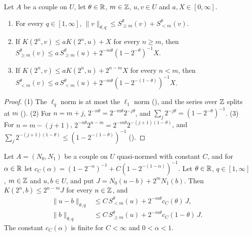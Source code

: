 \begin{lemma}
\label{lem:holmstedt-sums}
\leanok
{}
Let $A$ be a couple on $U$, let $\theta \in \mathbb{R}$, $m \in \mathbb{Z}$, $u, v \in U$ and
$a, X \in [0, \infty]$.
\begin{enumerate}
  \item For every $q \in [1, \infty]$,
    $\|v\|_{\theta, q} \leq S^{\theta}_{\geq m}(v) + S^{\theta}_{<m}(v)$.
  \item If $K(2^n, v) \leq a K(2^n, u) + X$ for every $n \geq m$, then
    $S^{\theta}_{\geq m}(v) \leq a \, S^{\theta}_{\geq m}(u) + 2^{-m\theta} (1 - 2^{-\theta})^{-1}
    X$.
  \item If $K(2^n, v) \leq a K(2^n, u) + 2^{n-m} X$ for every $n < m$, then
    $S^{\theta}_{<m}(v) \leq a \, S^{\theta}_{<m}(u) + 2^{-m\theta}
    (1 - 2^{-(1-\theta)})^{-1} X$.
\end{enumerate}
\end{lemma}

\begin{proof}
\leanok
(1) The $\ell_q$ norm is at most the $\ell_1$ norm (), and the series over
$\mathbb{Z}$ splits at $m$ (). (2) For $n = m + j$,
$2^{-n\theta} = 2^{-m\theta} 2^{-j\theta}$, and $\sum_j 2^{-j\theta} = (1 - 2^{-\theta})^{-1}$.
(3) For $n = m - (j + 1)$, $2^{-n\theta} 2^{n-m} = 2^{-m\theta} 2^{-(j+1)(1-\theta)}$, and
$\sum_j 2^{-(j+1)(1-\theta)} \leq (1 - 2^{-(1-\theta)})^{-1}$
().
\end{proof}

\begin{lemma}
\label{lem:holmstedt-halves}
\leanok
{}
Let $A = (N_0, N_1)$ be a couple on $U$ quasi-normed with constant $C$, and for $\alpha \in \mathbb{R}$
let $c_C(\alpha) = (1 - 2^{-\alpha})^{-1} + C (1 - 2^{-(1-\alpha)})^{-1}$. Let $\theta \in \mathbb{R}$,
$q \in [1, \infty]$, $m \in \mathbb{Z}$ and $u, b \in U$, and put $J = N_0(u - b) + 2^m N_1(b)$. Then
$K(2^n, b) \leq 2^{n-m} J$ for every $n \in \mathbb{Z}$, and
\begin{align*}
  \|u - b\|_{\theta, q} &\leq C \, S^{\theta}_{<m}(u) + 2^{-m\theta} c_C(\theta) \, J , \\
  \|b\|_{\theta, q} &\leq C \, S^{\theta}_{\geq m}(u) + 2^{-m\theta} c_C(1 - \theta) \, J .
\end{align*}
The constant $c_C(\alpha)$ is finite for $C < \infty$ and $0 < \alpha < 1$.
\end{lemma}

